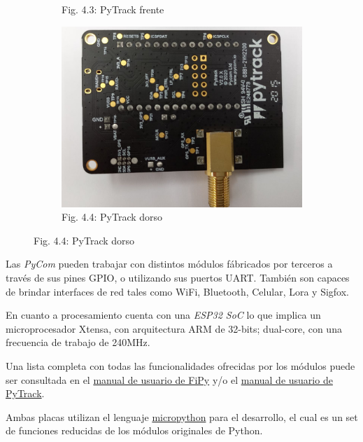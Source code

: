\documentclass[12pt]{article}
\begin{document}
\begin{figure}[ht]
\begin{subfigure}[b]{0.45\linewidth}
    \caption{Fig. 4.3: PyTrack frente}
    \label{fig:PyTrack-fte}
  \end{subfigure}
  \begin{subfigure}[b]{0.45\linewidth}
    \includegraphics[width=\linewidth]{images/PyTrack-2.jpg}
    \caption{Fig. 4.4: PyTrack dorso}
    \label{fig:PyTrack-dor}
  \end{subfigure}
\end{figure}

Las \textit{PyCom} pueden trabajar con distintos módulos fábricados por terceros a través de sus pines GPIO, o utilizando sus puertos UART. También son capaces de brindar interfaces de red tales como WiFi, Bluetooth, Celular, Lora y Sigfox.

En cuanto a procesamiento cuenta con una \textit{ESP32 SoC} lo que implica un microprocesador Xtensa, con arquitectura ARM de 32-bits; dual-core, con una frecuencia de trabajo de 240MHz.

Una lista completa con todas las funcionalidades ofrecidas por los módulos puede ser consultada en el \href{https://docs.pycom.io/gitbook/assets/specsheets/Pycom_002_Specsheets_FiPy_v2.pdf}{manual de usuario de FiPy} y/o el \href{https://pycom.io/product/pytrack-2-0-x/}{manual de usuario de PyTrack}.

Ambas placas utilizan el lenguaje \href{https://github.com/micropython/micropython}{micropython} para el desarrollo, el cual es un set de funciones reducidas de los módulos originales de Python.
\end{document}
